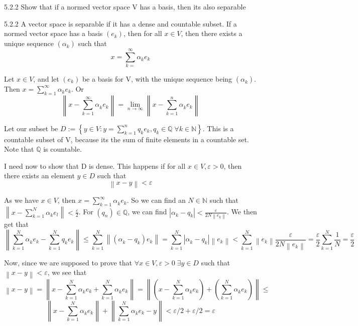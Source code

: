 \documentclass[a4paper,norsk]{article}
\renewcommand{\leq}{\leqslant}
\renewcommand{\epsilon}{\varepsilon}
\begin{document}
\begin{oppgavebox}{5.2.2}{}
Show that if a normed vector space V has a basis, then its also separable

\begin{proofbox}{5.2.2}{}
  A vector space is separable if it has a dense and countable subset. If a normed vector space has a basis $ \left( e_k \right)  $, then for all $ x \in V $, then there exists a unique sequence $ \left( \alpha_{k}^{}  \right)  $ such that 
  \[
      x = \sum_{ k= }^{ \infty } \alpha_{k}^{} e_k
  \]
  


  Let $ x \in  V $, and let $ \left( e_k \right)  $ be a basis for V, with the unique sequence being $ \left( \alpha_{k}^{}  \right)  $. Then
  $ x = \sum_{ k=1 }^{ \infty } \alpha_{k}^{} e_k $. Or
  \[
      \left\lVert x - \sum_{k=1}^{\infty} \alpha_{k}^{} e_k   \right\rVert = \lim_{n \to \infty}  \left\lVert x - \sum_{k=1}^{n} \alpha_{k}^{} e_k   \right\rVert 
  \]

  Let our subset be $ D := \left\{ y \in V : y = \sum_{k=1}^{n} q_k e_k, q_k \in \mathbb{Q} \; \forall k \in \mathbb{N}  \right\}  $. This is a countable subset of V, because its the sum of finite elements in a countable set. Note that $ \mathbb{Q} $ is countable. 


  I need now to show that D is dense. This happens if for all $ x \in V, \epsilon > 0$, then there exists an element $ y \in D $  such that 
  \[
      \left\lVert x-y \right\rVert < \epsilon 
  \]


  As we have $ x \in V $, then $ x = \sum_{k=1}^{\infty} \alpha_{k}^{} e_k    $. So we can find an $ N \in \mathbb{N} $ such that $ \left\lVert x - \sum_{k=1}^{N} \alpha_{k}^{} e_l  \right\rVert < \frac{ \epsilon   }{ 2 }  $. For $ \left( q_n \right) \in \mathbb{Q} $, we can find $ \left| \alpha_{k}^{} - q_k \right| < \frac{ \epsilon    }{ 2 N \left\lVert e_k \right\rVert  }  $. We then get that
  \[
      \left\lVert \sum_{k=1}^{N} \alpha_{k}^{} e_k - \sum_{k=1}^{N} q_k e_k    \right\rVert \leq  \sum_{k=1}^{N} \left\lVert \left( \alpha_{k}^{} - q_k \right) e_k  \right\rVert  = \sum_{k=1}^{N} \left| \alpha_{k}^{} - q_k \right| \left\lVert e_k \right\rVert   < \sum_{k=1}^{N} \left\lVert e_k \right\rVert  \frac{ \epsilon   }{ 2 N \left\lVert e_k \right\rVert  } = \frac{ \epsilon  }{ 2  } \sum_{k=1}^{N} \frac{ 1 }{ N } = \frac{ \epsilon  }{ 2 }
  \]


  Now, since we are supposed to prove that $ \forall x \in V, \epsilon > 0 \; \exists y \in D $ such that $ \left\lVert x-y \right\rVert < \epsilon  $, we see that
  \[
      \left\lVert x-y \right\rVert = \left\lVert x - \sum_{k=1}^{N} \alpha_{k}^{} e_k + \sum_{k=1}^{N} \alpha_{k}^{}  e_k    \right\rVert = \left\lVert \left( x - \sum_{k=1}^{N} \alpha_{k}^{} e_k  \right) + \left( \sum_{k=1}^{N} \alpha_{k}^{}  e_k   \right)   \right\rVert \leq
  \]
  \[
      \left\lVert x - \sum_{k=1}^{N} \alpha_{k}^{} e_k  \right\rVert + \left\lVert \sum_{k=1}^{N} \alpha_{k}^{} e_k - y  \right\rVert < \epsilon /2 + \epsilon /2 = \epsilon 
  \]
  


\end{proofbox}
\end{oppgavebox}
\end{document}
